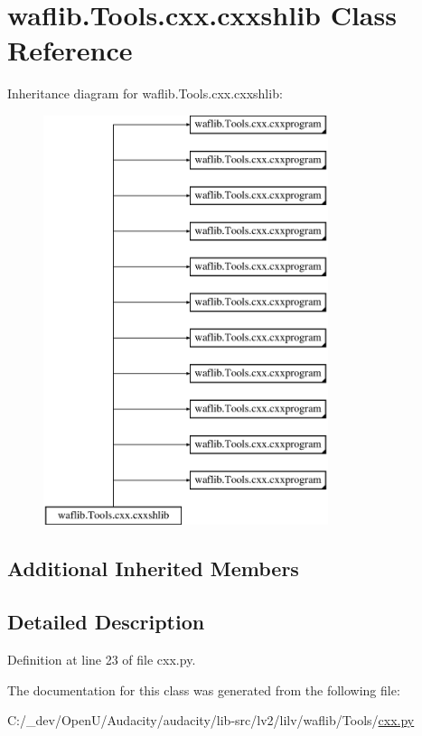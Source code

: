 \hypertarget{classwaflib_1_1_tools_1_1cxx_1_1cxxshlib}{}\section{waflib.\+Tools.\+cxx.\+cxxshlib Class Reference}
\label{classwaflib_1_1_tools_1_1cxx_1_1cxxshlib}
Inheritance diagram for waflib.\+Tools.\+cxx.\+cxxshlib\+:\begin{figure}[H]
\begin{center}
\leavevmode
\includegraphics[height=12.000000cm]{classwaflib_1_1_tools_1_1cxx_1_1cxxshlib}
\end{center}
\end{figure}
\subsection*{Additional Inherited Members}


\subsection{Detailed Description}


Definition at line 23 of file cxx.\+py.



The documentation for this class was generated from the following file\+:\begin{DoxyCompactItemize}
\item 
C\+:/\+\_\+dev/\+Open\+U/\+Audacity/audacity/lib-\/src/lv2/lilv/waflib/\+Tools/\hyperlink{lilv_2waflib_2_tools_2cxx_8py}{cxx.\+py}\end{DoxyCompactItemize}
